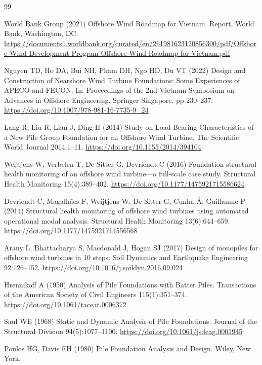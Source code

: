\documentclass[11pt]{article}
\begin{document}
\begin{thebibliography}{99}

World Bank Group (2021) Offshore Wind Roadmap for Vietnam. Report, World Bank, Washington, DC. \url{https://documents1.worldbank.org/curated/en/261981623120856300/pdf/Offshore-Wind-Development-Program-Offshore-Wind-Roadmap-for-Vietnam.pdf}

Nguyen TD, Ho DA, Bui NH, Pham DH, Ngo HD, Du VT (2022) Design and Construction of Nearshore Wind Turbine Foundations: Some Experiences of APECO and FECON. In: Proceedings of the 2nd Vietnam Symposium on Advances in Offshore Engineering. Springer Singapore, pp 230--237. \url{https://doi.org/10.1007/978-981-16-7735-9_24}

Lang R, Liu R, Lian J, Ding H (2014) Study on Load-Bearing Characteristics of a New Pile Group Foundation for an Offshore Wind Turbine. The Scientific World Journal 2014:1--11. \url{https://doi.org/10.1155/2014/394104}

Weijtjens W, Verbelen T, De Sitter G, Devriendt C (2016) Foundation structural health monitoring of an offshore wind turbine---a full-scale case study. Structural Health Monitoring 15(4):389--402. \url{https://doi.org/10.1177/1475921715586624}

Devriendt C, Magalh{\~a}es F, Weijtjens W, De Sitter G, Cunha {\'A}, Guillaume P (2014) Structural health monitoring of offshore wind turbines using automated operational modal analysis. Structural Health Monitoring 13(6):644--659. \url{https://doi.org/10.1177/1475921714556568}

Arany L, Bhattacharya S, Macdonald J, Hogan SJ (2017) Design of monopiles for offshore wind turbines in 10 steps. Soil Dynamics and Earthquake Engineering 92:126--152. \url{https://doi.org/10.1016/j.soildyn.2016.09.024}

Hrennikoff A (1950) Analysis of Pile Foundations with Batter Piles. Transactions of the American Society of Civil Engineers 115(1):351--374. \url{https://doi.org/10.1061/taceat.0006372}

Saul WE (1968) Static and Dynamic Analysis of Pile Foundations. Journal of the Structural Division 94(5):1077--1100. \url{https://doi.org/10.1061/jsdeag.0001945}

Poulos HG, Davis EH (1980) Pile Foundation Analysis and Design. Wiley, New York.


\end{thebibliography}
\end{document}
